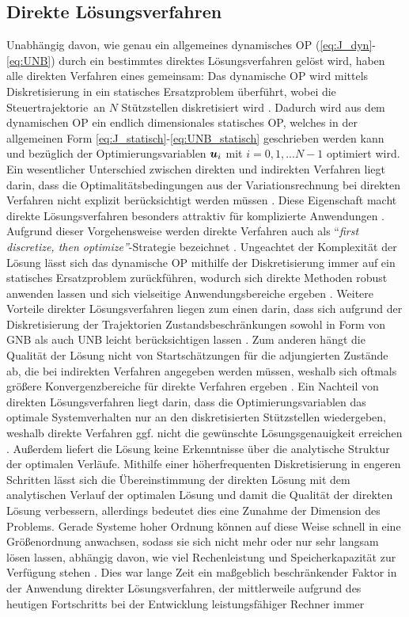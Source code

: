 \subsection{Direkte Lösungsverfahren}\label{subsec:Direkt}
Unabhängig davon, wie genau ein allgemeines dynamisches \gls{OP} (\eqref{eq:J_dyn}- \eqref{eq:UNB}) durch ein bestimmtes direktes Lösungsverfahren gelöst wird, haben alle direkten Verfahren eines gemeinsam: Das dynamische \gls{OP} wird mittels Diskretisierung in ein statisches Ersatzproblem überführt, wobei die Steuertrajektorie \uoft\,an $N$ Stützstellen diskretisiert wird \cite{KnutGraichen.2012}. Dadurch wird aus dem dynamischen \gls{OP} ein endlich dimensionales statisches \gls{OP}, welches in der allgemeinen Form \eqref{eq:J_statisch}-\eqref{eq:UNB_statisch} geschrieben werden kann und bezüglich der Optimierungsvariablen $\boldsymbol{u}_i$ mit $i=0,1,...N-1$ optimiert wird. Ein wesentlicher Unterschied zwischen direkten und indirekten Verfahren liegt darin, dass die Optimalitätsbedingungen aus der Variationsrechnung bei direkten Verfahren nicht explizit berücksichtigt werden müssen \cite{Rathgeber.2016}. Diese Eigenschaft macht direkte Lösungsverfahren besonders attraktiv für komplizierte Anwendungen \cite{Betts.1998}. Aufgrund dieser Vorgehensweise werden direkte Verfahren auch als ``\textit{first discretize, then optimize''}-Strategie bezeichnet \cite{Papageorgiou.2012}. Ungeachtet der Komplexität der Lösung lässt sich das dynamische \gls{OP} mithilfe der Diskretisierung immer auf ein statisches Ersatzproblem zurückführen, wodurch sich direkte Methoden robust anwenden lassen und sich vielseitige Anwendungsbereiche ergeben \cite{Betts.1998}. Weitere Vorteile direkter Lösungsverfahren liegen zum einen darin, dass sich aufgrund der Diskretisierung der Trajektorien Zustandsbeschränkungen sowohl in Form von \gls{GNB} als auch \gls{UNB} leicht berücksichtigen lassen \cite{KnutGraichen.2012}. Zum anderen hängt die Qualität der Lösung nicht von Startschätzungen für die adjungierten Zustände ab, die bei indirekten Verfahren angegeben werden müssen, weshalb sich oftmals größere Konvergenzbereiche für direkte Verfahren ergeben \cite{KnutGraichen.2012}. Ein Nachteil von direkten Lösungsverfahren liegt darin, dass die Optimierungsvariablen das optimale Systemverhalten nur an den diskretisierten Stützstellen wiedergeben, weshalb direkte Verfahren ggf. nicht die gewünschte Lösungsgenauigkeit erreichen \cite{Papageorgiou.2012}. Außerdem liefert die Lösung keine Erkenntnisse über die analytische Struktur der optimalen Verläufe. Mithilfe einer höherfrequenten Diskretisierung in engeren Schritten lässt sich die Übereinstimmung der direkten Lösung mit dem analytischen Verlauf der optimalen Lösung und damit die Qualität der direkten Lösung verbessern, allerdings bedeutet dies eine Zunahme der Dimension des Problems. Gerade Systeme hoher Ordnung können auf diese Weise schnell in eine Größenordnung anwachsen, sodass sie sich nicht mehr oder nur sehr langsam lösen lassen, abhängig davon, wie viel Rechenleistung und Speicherkapazität zur Verfügung stehen \cite{Papageorgiou.2012}. Dies war lange Zeit ein maßgeblich beschränkender Faktor in der Anwendung direkter Lösungsverfahren, der mittlerweile aufgrund des heutigen Fortschritts bei der Entwicklung leistungsfähiger Rechner immer 